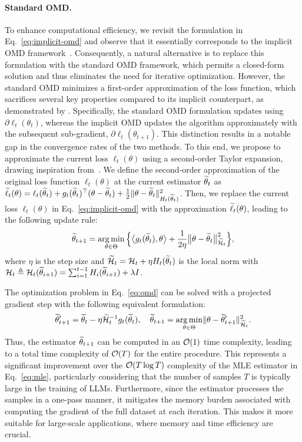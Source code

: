 \paragraph{Standard OMD.} To enhance computational efficiency, we revisit the formulation in Eq.~\eqref{eq:implicit-omd} and observe that it essentially corresponds to the implicit OMD framework~\citep{IC'97:EG}. Consequently, a natural alternative is to replace this formulation with the standard OMD framework, which permits a closed-form solution and thus eliminates the need for iterative optimization. However, the standard OMD minimizes a first-order approximation of the loss function, which sacrifices several key properties compared to its implicit counterpart, as demonstrated by \citet{NeurIPS'20:Campolongo-IOMD}. Specifically, the standard OMD formulation updates using $\partial \ell_t(\theta_t)$, whereas the implicit OMD updates the algorithm approximately with the subsequent sub-gradient, $\partial \ell_t(\theta_{t+1})$. This distinction results in a notable gap in the convergence rates of the two methods. To this end, we propose to approximate the current loss $\ell_t(\theta)$ using a second-order Taylor expansion, drawing inspiration from~\citet{NeurIPS'23:MLogB}. We define the second-order approximation of the original loss function $\ell_t(\theta)$ at the current estimator $\widetilde{\theta}_t$ as $\widetilde{\ell}_t(\theta) = \ell_t(\widetilde{\theta}_t) + g_t(\widetilde{\theta}_t)^\top (\theta - \widetilde{\theta}_t) + \frac{1}{2} \lVert\theta - \widetilde{\theta}_t\rVert_{H_t(\widetilde{\theta}_t)}^2$. Then, we replace the current loss $\ell_t(\theta)$ in Eq.~\eqref{eq:implicit-omd} with the approximation $\widetilde{\ell}_t(\theta)$, leading to the following update rule:
\begin{align}
  \label{eq:omd}
  \widetilde{\theta}_{t+1}=\operatorname*{arg\,min}_{\theta \in \Theta} \Big\{\big\langle g_t(\widetilde{\theta}_t), \theta \big\rangle +\frac{1}{2 \eta}\big\|\theta-\widetilde{\theta}_t\big\|_{\widetilde{\mathcal{H}}_t}^2\Big\},
\end{align}
where $\eta$ is the step size and $\widetilde{\mathcal{H}}_t = \mathcal{H}_t + \eta H_t(\widetilde{\theta}_t)$ is the local norm with $\mathcal{H}_t \triangleq \mathcal{H}_t(\widetilde{\theta}_{i+1}) = \sum_{i=1}^{t-1} H_i(\widetilde{\theta}_{i+1}) + \lambda I$. 

The optimization problem in Eq.~\eqref{eq:omd} can be solved with a projected gradient step with the following equivalent formulation:
\begin{align*}
  \widetilde{\theta}_{t+1}^{\prime} = \widetilde{\theta}_t - \eta \widetilde{\mathcal{H}}_t^{-1} g_t(\widetilde{\theta}_t), \quad \widetilde{\theta}_{t+1} = \operatorname*{arg\,min}_{\theta \in \Theta} \lVert\theta - \widetilde{\theta}_{t+1}^{\prime}\rVert_{\widetilde{\mathcal{H}}_t}^2.
\end{align*}
Thus, the estimator $\widetilde{\theta}_{t+1}$ can be computed in an $\mathcal{O}(1)$ time complexity, leading to a total time complexity of $\mathcal{O}(T)$ for the entire procedure. This represents a significant improvement over the $\mathcal{O}(T\log T)$ complexity of the MLE estimator in Eq.~\eqref{eq:mle}, particularly considering that the number of samples $T$ is typically large in the training of LLMs. Furthermore, since the estimator processes the samples in a one-pass manner, it mitigates the memory burden associated with computing the gradient of the full dataset at each iteration. This makes it more suitable for large-scale applications, where memory and time efficiency are crucial.

